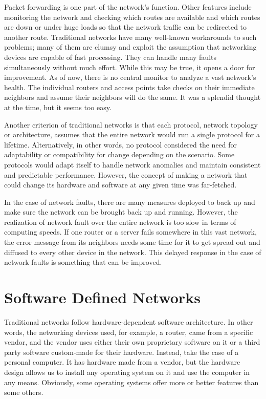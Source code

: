     Packet forwarding is one part of the network's function. Other features include monitoring the network and checking which routes are available and which routes are down or under huge loads so that the network traffic can be redirected to another route. Traditional networks have many well-known workarounds to such problems; many of them are clumsy and exploit the assumption that networking devices are capable of fast processing. They can handle many faults simultaneously without much effort. While this may be true, it opens a door for improvement. As of now, there is no central monitor to analyze a vast network's health. The individual routers and access points take checks on their immediate neighbors and assume their neighbors will do the same. It was a splendid thought at the time, but it seems too easy.
        
    Another criterion of traditional networks is that each protocol, network topology or architecture, assumes that the entire network would run a single protocol for a lifetime. Alternatively, in other words, no protocol considered the need for adaptability or compatibility for change depending on the scenario. Some protocols would adapt itself to handle network anomalies and maintain consistent and predictable performance. However, the concept of making a network that could change its hardware and software at any given time was far-fetched.
    
   In the case of network faults, there are many measures deployed to back up and make sure the network can be brought back up and running. However, the realization of network fault over the entire network is too slow in terms of computing speeds. If one router or a server fails somewhere in this vast network, the error message from its neighbors needs some time for it to get spread out and diffused to every other device in the network. This delayed response in the case of network faults is something that can be improved.
        
\section{Software Defined Networks}
    
    Traditional networks follow hardware-dependent software architecture. In other words, the networking devices used, for example, a router, came from a specific vendor, and the vendor uses either their own proprietary software on it or a third party software custom-made for their hardware. Instead, take the case of a personal computer. It has hardware made from a vendor, but the hardware design allows us to install any operating system on it and use the computer in any means. Obviously, some operating systems offer more or better features than some others.
    

